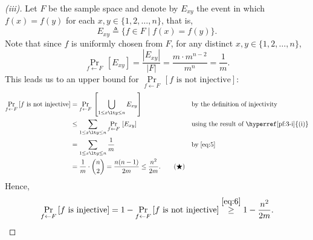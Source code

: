 \begin{proof}[(iii)]
    Let $F$ be the sample space and denote by $E_{xy}$ the event in which $f(x)=f(y)$ for each $x,y\in\{1,2,\ldots, n\}$, that is,
    \[
    E_{xy}\triangleq \{f\in F\mid f(x)=f(y)\}.
    \]
    Note that since $f$ is uniformly chosen from $F$, for any distinct $x,y\in\{1,2,\ldots, n\}$, 
    \[\label{eq:5}
    \Pr\limits_{f \leftarrow F}\,[E_{xy}]=\dfrac{|E_{xy}|}{|F|}=\dfrac{m\cdot m^{n-2}}{m^n}=\dfrac{1}{m}. \tag{$\spadesuit$}
    \]
    This leads us to an upper bound for $\Pr\limits_{f \leftarrow F}\,[f \text{ is not injective}]$:
    \begin{align*}\label{eq:6}
        \Pr\limits_{f \leftarrow F}\,[f \text{ is not injective}]
        &= \Pr\limits_{f \leftarrow F}\,\left[\bigcup_{1\le x\lt y\le n} E_{xy}\right] && \text{by the definition of injectivity}\\
        &\le \sum_{1\le x\lt y\le n}\Pr\limits_{f \leftarrow F}\,\left[ E_{xy}\right] && \text{using the result of \hyperref[pf:3-i]{(i)}}\\
        &= \sum_{1\le x\lt y\le n} \dfrac{1}{m} && \text{by}\;\eqref{eq:5}\\
        &= \dfrac{1}{m}\cdot \binom{n}{2}
        =\dfrac{n(n-1)}{2m}
        \le\dfrac{n^2}{2m}. \tag{$\bigstar$}
    \end{align*}
    Hence,
    \[
    \Pr\limits_{f \leftarrow F}\,[f \text{ is injective}]
    =1-\Pr\limits_{f \leftarrow F}\,[f \text{ is not injective}]
    \overset{\eqref{eq:6}}{\ge}1-\dfrac{n^2}{2m}.
    \]
\end{proof}



\clearpage
{}

